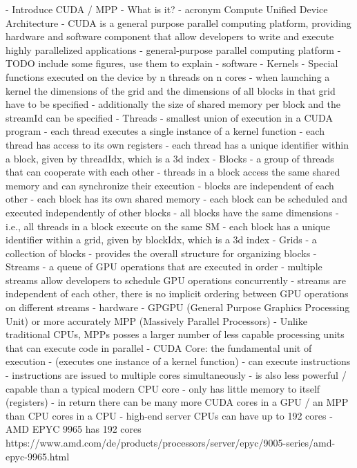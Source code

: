 - Introduce CUDA / MPP
	- What is it?
		- acronym Compute Unified Device Architecture
		- CUDA is a general purpose parallel computing platform, providing hardware and software component that allow developers to write and execute highly parallelized applications
		- general-purpose parallel computing platform
		- TODO include some figures, use them to explain
			- software
				- Kernels
					- Special functions executed on the device by n threads on n cores
					- when launching a kernel the dimensions of the grid and the dimensions of all blocks in that grid have to be specified
					- additionally the size of shared memory per block and the streamId can be specified
				- Threads
					- smallest union of execution in a CUDA program
					- each thread executes a single instance of a kernel function
					- each thread has access to its own registers
					- each thread has a unique identifier within a block, given by threadIdx, which is a 3d index
				- Blocks
					- a group of threads that can cooperate with each other
					- threads in a block access the same shared memory and can synchronize their execution
					- blocks are independent of each other
						- each block has its own shared memory
						- each block can be scheduled and executed independently of other blocks
					- all blocks have the same dimensions
						- i.e., all threads in a block execute on the same SM
					- each block has a unique identifier within a grid, given by blockIdx, which is a 3d index
				- Grids
					- a collection of blocks
					- provides the overall structure for organizing blocks
				- Streams
					- a queue of GPU operations that are executed in order
					- multiple streams allow developers to schedule GPU operations concurrently
					- streams are independent of each other, there is no implicit ordering between GPU operations on different streams
			- hardware
				- GPGPU (General Purpose Graphics Processing Unit) or more accurately MPP (Massively Parallel Processors)
				- Unlike traditional CPUs, MPPs posses a larger number of less capable processing units that can execute code in parallel
				- CUDA Core: the fundamental unit of execution
					- (executes one instance of a kernel function)
					- can execute instructions
						- instructions are issued to multiple cores simultaneously
					- is also less powerful / capable than a typical modern CPU core
					- only has little memory to itself (registers)
					- in return there can be many more CUDA cores in a GPU / an MPP than CPU cores in a CPU
					- high-end server CPUs can have up to 192 cores
						- AMD EPYC 9965 has 192 cores https://www.amd.com/de/products/processors/server/epyc/9005-series/amd-epyc-9965.html
